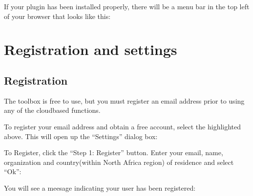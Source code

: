\documentclass[letterpaper,10pt,english]{sphinxmanual}
\begin{document}

\sphinxAtStartPar
If your plugin has been installed properly, there will be a menu bar in the top
left of your browser that looks like this:


\sphinxstepscope


\chapter{Registration and settings}
\label{\detokenize{Qgis_Plugin/Registration:registration-and-settings}}\label{\detokenize{Qgis_Plugin/Registration::doc}}




\section{Registration}
\label{\detokenize{Qgis_Plugin/Registration:registration}}\label{\detokenize{Qgis_Plugin/Registration:id1}}
\sphinxAtStartPar
The toolbox is free to use, but you must register an email address prior to
using any of the cloud\sphinxhyphen{}based functions.

\sphinxAtStartPar
To register your email address and obtain a free account, select the highlighted
above. This will open up the “Settings” dialog box:


\sphinxAtStartPar
To Register, click the “Step 1: Register” button. Enter your email, name,
organization and country(within North Africa region) of residence and select “Ok”:


\sphinxAtStartPar
You will see a meesage indicating your user has been registered:
\end{document}
